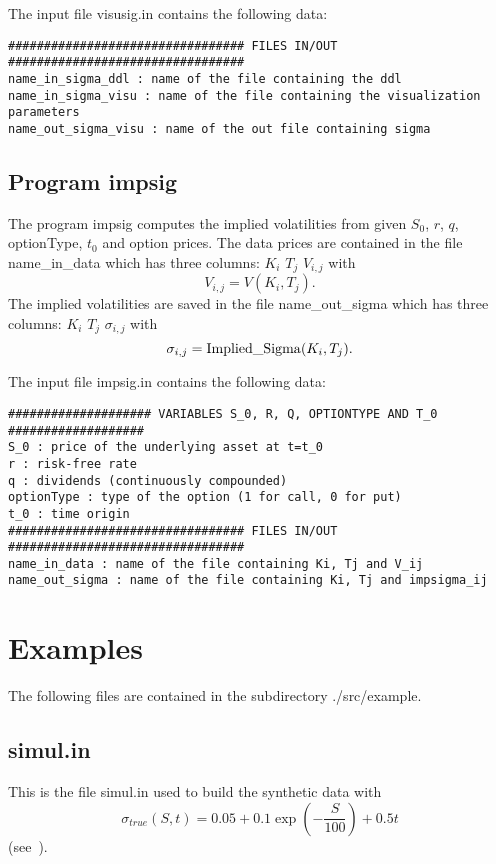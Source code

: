 \documentclass[12pt]{article}
\begin{document}
The input file visusig.in contains the following data:
\begin{verbatim}
################################# FILES IN/OUT #################################
name_in_sigma_ddl : name of the file containing the ddl
name_in_sigma_visu : name of the file containing the visualization parameters
name_out_sigma_visu : name of the out file containing sigma 
\end{verbatim}

\subsection{Program impsig}
\label{SSEC:IMPSIG}

The program impsig computes the implied volatilities from given 
$S_0$, $r$, $q$, optionType, $t_0$ and option prices. The data prices 
are contained in the file name\_in\_data which has three 
columns: $K_i$ $T_j$ $V_{i,j}$ with 
$$
V_{i,j} = V(K_i,T_j).
$$
The implied volatilities are saved in the file name\_out\_sigma which 
has three columns: $K_i$ $T_j$ $\sigma_{i,j}$ with 
$$
\sigma_{i,j} = {\rm Implied\_Sigma}(K_i,T_j).
$$

The input file impsig.in contains the following data:
\begin{verbatim}
#################### VARIABLES S_0, R, Q, OPTIONTYPE AND T_0 ###################
S_0 : price of the underlying asset at t=t_0
r : risk-free rate     
q : dividends (continuously compounded) 
optionType : type of the option (1 for call, 0 for put)  
t_0 : time origin
################################# FILES IN/OUT #################################
name_in_data : name of the file containing Ki, Tj and V_ij
name_out_sigma : name of the file containing Ki, Tj and impsigma_ij
\end{verbatim}

\section{Examples}

The following files are contained in the subdirectory ./src/example.

\subsection{simul.in}

This is the file simul.in used to build the synthetic data with 
$$
\sigma_{true}(S,t) = 0.05 
+ 0.1 \exp \left( -\frac{S}{100} \right) + 0.5 t
$$
(see~\cite{bcv:inria:02}).
\end{document}
